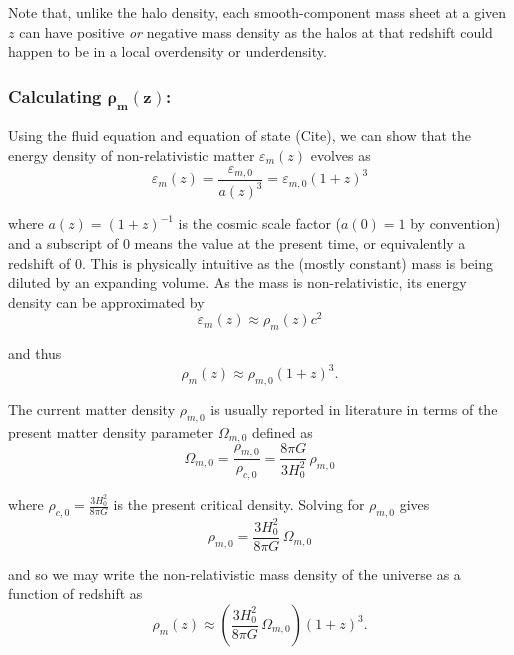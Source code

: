 \documentclass[%
 reprint,
 amsmath,amssymb,
 aps,nofootinbib
]{revtex4-1}
\begin{document}
\noindent Note that, unlike the halo density, each smooth-component mass sheet at a given $z$ can have positive \textit{or} negative mass density as the halos at that redshift could happen to be in a local overdensity or underdensity.

\subsubsection{Calculating $\mathbf{\rho_m(z)}$:}

Using the fluid equation and equation of state (Cite), we can show that the energy density of non-relativistic matter $\varepsilon_m(z)$ evolves as
\begin{equation}\label{energy_evol}
\varepsilon_m(z)=\frac{\varepsilon_{m,0}}{a(z)^3}=\varepsilon_{m,0}(1+z)^3
\end{equation}

\noindent where $a(z)=(1+z)^{-1}$ is the cosmic scale factor (${a(0)=1}$ by convention) and a subscript of 0 means the value at the present time, or equivalently a redshift of 0. This is physically intuitive as the (mostly constant) mass is being diluted by an expanding volume. As the mass is non-relativistic, its energy density can be approximated by
\begin{equation*}\label{energy_mass}
\varepsilon_m(z)\approx\rho_m(z)c^2
\end{equation*}

\noindent and thus
\begin{equation}\label{mass_evol}
\rho_m(z)\approx\rho_{m,0}(1+z)^3.
\end{equation}

The current matter density $\rho_{m,0}$ is usually reported in literature in terms of the present matter density parameter $\Omega_{m,0}$ defined as
\begin{equation}\label{}
\Omega_{m,0}=\frac{\rho_{m,0}}{\rho_{c,0}}=\frac{8\pi G}{3H_0^2}\,\rho_{m,0}
\end{equation}

\noindent where $\rho_{c,0}=\frac{3H_0^2}{8\pi G}$ is the present critical density. Solving for $\rho_{m,0}$ gives
\begin{equation*}\label{}
\rho_{m,0}=\frac{3H_0^2}{8\pi G}\,\Omega_{m,0}
\end{equation*}

\noindent and so we may write the non-relativistic mass density of the universe as a function of redshift as
\begin{equation}\label{rho}
\rho_m(z)\approx\left(\frac{3H_0^2}{8\pi G}\,\Omega_{m,0}\right)(1+z)^3.
\end{equation}
\end{document}
